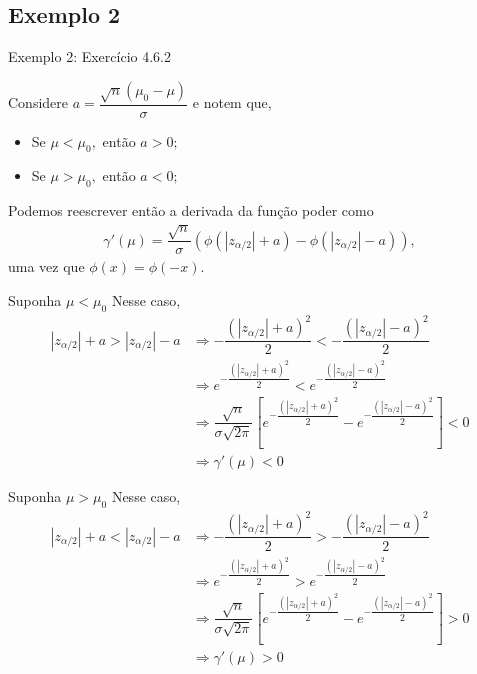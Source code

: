 \documentclass[12pt]{beamer}
\begin{document}
\subsection{Exemplo 2}
\begin{frame}{Exemplo 2: Exercício 4.6.2}
\begin{block}{}
\justifying
Considere $a=\dfrac{\sqrt{n}(\mu_0 - \mu)}{\sigma}$ e notem que,
\begin{itemize}
    \item Se $\mu<\mu_{0},$ então $a>0;$
    \pause
    \item Se $\mu>\mu_{0},$ então $a<0;$
\end{itemize}
\end{block}
\pause 
\begin{block}{}
\justifying
Podemos reescrever então a derivada da função poder como
\begin{align*}
\gamma'(\mu) = \dfrac{\sqrt{n}}{\sigma} \left(\phi\left( |z_{\alpha/2}|+a\right) - \phi\left(|z_{\alpha/2}|-a\right)\right),
\end{align*}
uma vez que $\phi(x)=\phi(-x).$ 
\end{block}
\end{frame}

\begin{frame}{}
\begin{block}{Suponha $\mu<\mu_{0}$}
\justifying
Nesse caso, 
\begin{align*}
    |z_{\alpha/2}|+a>|z_{\alpha/2}|-a&\Rightarrow -\dfrac{(|z_{\alpha/2}|+a)^{2}}{2}<-\dfrac{(|z_{\alpha/2}|-a)^{2}}{2}\\
    &\Rightarrow e^{-\dfrac{(|z_{\alpha/2}|+a)^{2}}{2}} < e^{-\dfrac{(|z_{\alpha/2}|-a)^{2}}{2}}\\
    &\Rightarrow \dfrac{\sqrt{n}}{\sigma\sqrt{2\pi}}\left[e^{-\dfrac{(|z_{\alpha/2}|+a)^{2}}{2}}-e^{-\dfrac{(|z_{\alpha/2}|-a)^{2}}{2}}\right]<0\\
    &\Rightarrow \gamma'(\mu)<0
\end{align*}
\end{block}
\end{frame}


\begin{frame}{}
\begin{block}{Suponha $\mu>\mu_{0}$}
\justifying
Nesse caso, 
\begin{align*}
    |z_{\alpha/2}|+a<|z_{\alpha/2}|-a&\Rightarrow -\dfrac{(|z_{\alpha/2}|+a)^{2}}{2}>-\dfrac{(|z_{\alpha/2}|-a)^{2}}{2}\\
    &\Rightarrow e^{-\dfrac{(|z_{\alpha/2}|+a)^{2}}{2}} > e^{-\dfrac{(|z_{\alpha/2}|-a)^{2}}{2}}\\
    &\Rightarrow \dfrac{\sqrt{n}}{\sigma\sqrt{2\pi}}\left[e^{-\dfrac{(|z_{\alpha/2}|+a)^{2}}{2}}-e^{-\dfrac{(|z_{\alpha/2}|-a)^{2}}{2}}\right]>0\\
    &\Rightarrow \gamma'(\mu)>0
\end{align*}
\end{block}
\end{frame}
\end{document}
